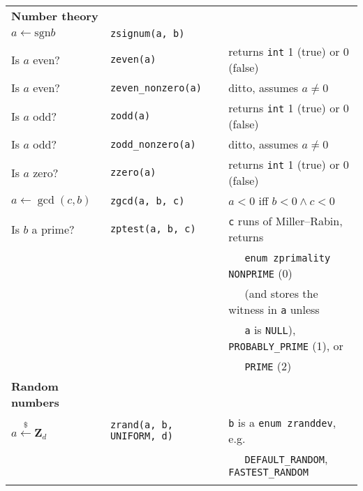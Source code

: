 \documentclass[10pt,draft]{article}
\newcommand{\entry}[3]{ #2 & {\tt #1} & #3 \\ }
\newcommand{\entrycont}[1]{ & & $~~~~~$ #1 \\ }
\newcommand{\entryTwo}[4]{\entry{#1}{#2}{#3}\entrycont{#4}}
\newcommand{\entryThree}[5]{\entryTwo{#1}{#2}{#3}{#4}\entrycont{#5}}
\newcommand{\entryFour}[6]{\entryThree{#1}{#2}{#3}{#4}{#5}\entrycont{#6}}
\newcommand{\entryFive}[7]{\entryFour{#1}{#2}{#3}{#4}{#5}{#6}\entrycont{#7}}
\begin{document}
\begin{tabular}{lll}
\textbf{Number theory} \\
\entry    {zsignum(a, b)}     {$a \gets \mbox{sgn} b$} {}
\entry    {zeven(a)}          {Is $a$ even?}           {returns {\tt int} 1 (true) or 0 (false)}
\entry    {zeven\_nonzero(a)} {Is $a$ even?}           {ditto, assumes $a \neq 0$}
\entry    {zodd(a)}           {Is $a$ odd?}            {returns {\tt int} 1 (true) or 0 (false)}
\entry    {zodd\_nonzero(a)}  {Is $a$ odd?}            {ditto, assumes $a \neq 0$}
\entry    {zzero(a)}          {Is $a$ zero?}           {returns {\tt int} 1 (true) or 0 (false)}
\entry    {zgcd(a, b, c)}     {$a \gets \gcd(c, b)$}   {$a < 0$ iff $b < 0 \wedge c < 0$}
\entryFive{zptest(a, b, c)}   {Is $b$ a prime?}        {{\tt c} runs of Miller--Rabin, returns}
                                                       {{\tt enum zprimality} {\tt NONPRIME} (0)}
                                                       {(and stores the witness in {\tt a} unless}
                                                       {{\tt a} is {\tt NULL}), {\tt PROBABLY\_PRIME} (1), or}
                                                       {{\tt PRIME} (2)}

\textbf{Random numbers} \\
\entryTwo{zrand(a, b, UNIFORM, d)} {$a \xleftarrow{\$} \textbf{Z}_d$}
         {{\tt b} is a {\tt enum zranddev}, e.g.}
         {{\tt DEFAULT\_RANDOM}, {\tt FASTEST\_RANDOM}}
\\



\end{tabular}
\end{document}
